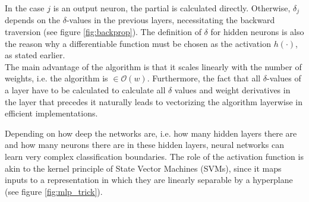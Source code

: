 \noindent In the case $j$ is an output neuron, the partial is calculated directly. Otherwise, $\delta_j$ depends on the $\delta$-values in the previous layers, necessitating the backward traversion (see figure \ref{fig:backprop}). The definition of $\delta$ for hidden neurons is also the reason why a differentiable function must be chosen as the activation $h(\cdot)$, as stated earlier.\\

\noindent The main advantage of the algorithm is that it scales linearly with the number of weights, i.e. the algorithm is $\in \mathcal{O}(w)$. Furthermore, the fact that all $\delta$-values of a layer have to be calculated to calculate all $\delta$ values and weight derivatives in the layer that precedes it naturally leads to vectorizing the algorithm layerwise in efficient implementations. \cite{nielsen_book}\cite{ng_lecture}\cite[pp. 241-245]{bishop_pattern}



\noindent Depending on how deep the networks are, i.e. how many hidden layers there are and how many neurons there are in these hidden layers, neural networks can learn very complex classification boundaries. The role of the activation function is akin to the kernel principle of State Vector Machines (SVMs), since it maps inputs to a representation in which they are linearly separable by a hyperplane (see figure \ref{fig:mlp_trick}).

